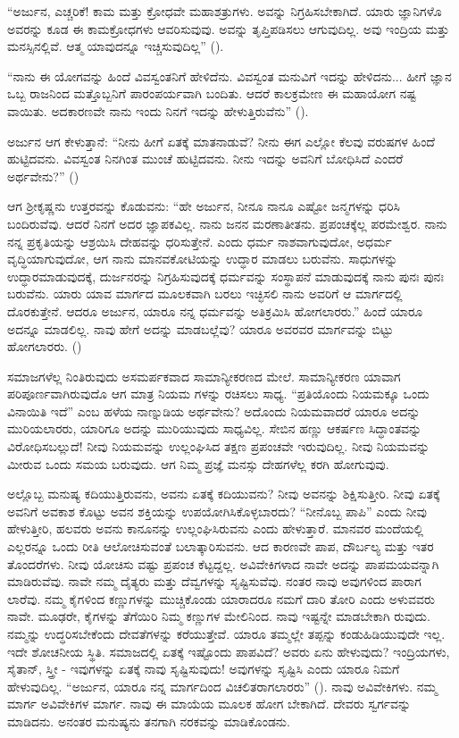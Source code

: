 “ಅರ್ಜುನ, ಎಚ್ಚರಿಕೆ! ಕಾಮ ಮತ್ತು ಕ್ರೋಧವೇ ಮಹಾಶತ್ರುಗಳು. ಅವನ್ನು ನಿಗ್ರಹಿಸಬೇಕಾಗಿದೆ. ಯಾರು ಜ್ಞಾನಿಗಳೊ ಅವರನ್ನು ಕೂಡ ಈ ಕಾಮಕ್ರೋಧಗಳು ಆವರಿಸುವುವು. ಅವನ್ನು ತೃಪ್ತಿಪಡಿಸಲು ಆಗುವುದಿಲ್ಲ. ಅವು ಇಂದ್ರಿಯ ಮತ್ತು ಮನಸ್ಸಿನಲ್ಲಿವೆ. ಆತ್ಮ ಯಾವುದನ್ನೂ ಇಚ್ಚಿಸುವುದಿಲ್ಲ” ().

“ನಾನು ಈ ಯೋಗವನ್ನು ಹಿಂದೆ ವಿವಸ್ವಂತನಿಗೆ ಹೇಳಿದೆನು. ವಿವಸ್ವಂತ ಮನುವಿಗೆ ಇದನ್ನು ಹೇಳಿದನು... ಹೀಗೆ ಜ್ಞಾನ ಒಬ್ಬ ರಾಜನಿಂದ ಮತ್ತೊಬ್ಬನಿಗೆ ಪಾರಂಪರ್ಯವಾಗಿ ಬಂದಿತು. ಆದರೆ ಕಾಲಕ್ರಮೇಣ ಈ ಮಹಾಯೋಗ ನಷ್ಟ ವಾಯಿತು. ಅದಕಾರಣವೇ ನಾನು ಇಂದು ನಿನಗೆ ಇದನ್ನು ಹೇಳುತ್ತಿರುವೆನು” ().

ಅರ್ಜುನ ಆಗ ಕೇಳುತ್ತಾನೆ: “ನೀನು ಹೀಗೆ ಏತಕ್ಕೆ ಮಾತನಾಡುವೆ? ನೀನು ಈಗ ಎಲ್ಲೋ ಕೆಲವು ವರುಷಗಳ ಹಿಂದೆ ಹುಟ್ಟಿದವನು. ವಿವಸ್ವಂತ ನಿನಗಿಂತ ಮುಂಚೆ ಹುಟ್ಟಿದವನು. ನೀನು ಇದನ್ನು ಅವನಿಗೆ ಬೋಧಿಸಿದೆ ಎಂದರೆ ಅರ್ಥವೇನು?” ()

ಆಗ ಶ‍್ರೀಕೃಷ್ಣನು ಉತ್ತರವನ್ನು ಕೊಡುವನು: “ಹೇ ಅರ್ಜುನ, ನೀನೂ ನಾನೂ ಎಷ್ಟೋ ಜನ್ಮಗಳನ್ನು ಧರಿಸಿ ಬಂದಿರುವೆವು. ಆದರೆ ನಿನಗೆ ಅದರ ಜ್ಞಾಪಕವಿಲ್ಲ. ನಾನು ಜನನ ಮರಣಾತೀತನು. ಪ್ರಪಂಚಕ್ಕೆಲ್ಲ ಪರಮೇಶ್ವರ. ನಾನು ನನ್ನ ಪ್ರಕೃತಿಯನ್ನು ಆಶ್ರಯಿಸಿ ದೇಹವನ್ನು ಧರಿಸುತ್ತೇನೆ. ಎಂದು ಧರ್ಮ ನಾಶವಾಗುವುದೋ, ಅಧರ್ಮ ವೃದ್ಧಿಯಾಗುವುದೋ, ಆಗ ನಾನು ಮಾನವಕೋಟಿಯನ್ನು ಉದ್ಧಾರ ಮಾಡಲು ಬರುವೆನು. ಸಾಧುಗಳನ್ನು ಉದ್ಧಾರಮಾಡುವುದಕ್ಕೆ, ದುರ್ಜನರನ್ನು ನಿಗ್ರಹಿಸುವುದಕ್ಕೆ ಧರ್ಮವನ್ನು ಸಂಸ್ಥಾಪನೆ ಮಾಡುವುದಕ್ಕೆ ನಾನು ಪುನಃ ಪುನಃ ಬರುವೆನು. ಯಾರು ಯಾವ ಮಾರ್ಗದ ಮೂಲಕವಾಗಿ ಬರಲು ಇಚ್ಛಿಸಲಿ ನಾನು ಅವರಿಗೆ ಆ ಮಾರ್ಗದಲ್ಲಿ ದೊರಕುತ್ತೇನೆ. ಆದರೂ ಅರ್ಜುನ, ಯಾರೂ ನನ್ನ ಧರ್ಮವನ್ನು ಅತಿಕ್ರಮಿಸಿ ಹೋಗಲಾರರು.” ಹಿಂದೆ ಯಾರೂ ಅದನ್ನೂ ಮಾಡಲಿಲ್ಲ. ನಾವು ಹೇಗೆ ಅದನ್ನು ಮಾಡಬಲ್ಲೆವು? ಯಾರೂ ಅವರವರ ಮಾರ್ಗವನ್ನು ಬಿಟ್ಟು ಹೋಗಲಾರರು. ()

ಸಮಾಜಗಳೆಲ್ಲ ನಿಂತಿರುವುದು ಅಸಮರ್ಪಕವಾದ ಸಾಮಾನ್ಯೀಕರಣದ ಮೇಲೆ. ಸಾಮಾನ್ಯೀಕರಣ ಯಾವಾಗ ಪರಿಪೂರ್ಣವಾಗಿರುವುದೊ ಆಗ ಮಾತ್ರ ನಿಯಮ ಗಳನ್ನು ರಚಿಸಲು ಸಾಧ್ಯ. “ಪ್ರತಿಯೊಂದು ನಿಯಮಕ್ಕೂ ಒಂದು ವಿನಾಯಿತಿ ಇದೆ” ಎಂಬ ಹಳೆಯ ನಾಣ್ನುಡಿಯ ಅರ್ಥವೇನು? ಅದೊಂದು ನಿಯಮವಾದರೆ ಯಾರೂ ಅದನ್ನು ಮುರಿಯಲಾರರು, ಯಾರಿಗೂ ಅದನ್ನು ಮುರಿಯುವುದು ಸಾಧ್ಯವಿಲ್ಲ. ಸೇಬಿನ ಹಣ್ಣು ಆಕರ್ಷಣ ಸಿದ್ಧಾಂತವನ್ನು ವಿರೋಧಿಸಬಲ್ಲುದೆ! ನೀವು ನಿಯಮವನ್ನು ಉಲ್ಲಂಘಿಸಿದ ತಕ್ಷಣ ಪ್ರಪಂಚವೇ ಇರುವುದಿಲ್ಲ. ನೀವು ನಿಯಮವನ್ನು ಮೀರುವ ಒಂದು ಸಮಯ ಬರುವುದು. ಆಗ ನಿಮ್ಮ ಪ್ರಜ್ಞೆ ಮನಸ್ಸು ದೇಹಗಳೆಲ್ಲ ಕರಗಿ ಹೋಗುವುವು.

ಅಲ್ಲೊಬ್ಬ ಮನುಷ್ಯ ಕದಿಯುತ್ತಿರುವನು, ಅವನು ಏತಕ್ಕೆ ಕದಿಯುವನು? ನೀವು ಅವನನ್ನು ಶಿಕ್ಷಿಸುತ್ತೀರಿ. ನೀವು ಏತಕ್ಕೆ ಅವನಿಗೆ ಅವಕಾಶ ಕೊಟ್ಟು ಅವನ ಶಕ್ತಿಯನ್ನು ಉಪಯೋಗಿಸಿಕೊಳ್ಳಬಾರದು? “ನೀನೊಬ್ಬ ಪಾಪಿ” ಎಂದು ನೀವು ಹೇಳುತ್ತೀರಿ, ಹಲವರು ಅವನು ಕಾನೂನನ್ನು ಉಲ್ಲಂಘಿಸಿರುವನು ಎಂದು ಹೇಳುತ್ತಾರೆ. ಮಾನವರ ಮಂದೆಯಲ್ಲಿ ಎಲ್ಲರನ್ನೂ ಒಂದು ರೀತಿ ಆಲೋಚಿಸುವಂತೆ ಬಲಾತ್ಕಾರಿಸುವನು. ಆದ ಕಾರಣವೇ ಪಾಪ, ದೌರ್ಬಲ್ಯ ಮತ್ತು ಇತರ ತೊಂದರೆಗಳು. ನೀವು ಯೋಚಿಸು ವಷ್ಟು ಪ್ರಪಂಚ ಕೆಟ್ಟದ್ದಲ್ಲ. ಅವಿವೇಕಿಗಳಾದ ನಾವೇ ಅದನ್ನು ಪಾಪಮಯವನ್ನಾಗಿ ಮಾಡಿರುವೆವು. ನಾವೇ ನಮ್ಮ ದೈತ್ಯರು ಮತ್ತು ದೆವ್ವಗಳನ್ನು ಸೃಷ್ಟಿಸುವೆವು. ನಂತರ ನಾವು ಅವುಗಳಿಂದ ಪಾರಾಗ ಲಾರೆವು. ನಮ್ಮ ಕೈಗಳಿಂದ ಕಣ್ಣುಗಳನ್ನು ಮುಚ್ಚಿಕೊಂಡು ಯಾರಾದರೂ ನಮಗೆ ದಾರಿ ತೋರಿ ಎಂದು ಅಳುವವರು ನಾವೇ. ಮೂಢರೇ, ಕೈಗಳನ್ನು ತೆಗೆಯಿರಿ ನಿಮ್ಮ ಕಣ್ಣುಗಳ ಮೇಲಿನಿಂದ. ನಾವು ಇಷ್ಟನ್ನೇ ಮಾಡಬೇಕಾಗಿ ರುವುದು. ನಮ್ಮನ್ನು ಉದ್ಧರಿಸಬೇಕೆಂದು ದೇವತೆಗಳನ್ನು ಕರೆಯುತ್ತೇವೆ. ಯಾರೂ ತಮ್ಮಲ್ಲೇ ತಪ್ಪನ್ನು ಕಂಡುಹಿಡಿಯುವುದೇ ಇಲ್ಲ. ಇದೇ ಶೋಚನೀಯ ಸ್ಥಿತಿ. ಸಮಾಜದಲ್ಲಿ ಏತಕ್ಕೆ ಇಷ್ಟೊಂದು ಪಾಪವಿದೆ? ಅವರು ಏನು ಹೇಳುವುದು? ಇಂದ್ರಿಯಗಳು, ಸೈತಾನ್​, ಸ್ತ್ರೀ - ಇವುಗಳನ್ನು ಏತಕ್ಕೆ ನಾವು ಸೃಷ್ಟಿಸುವುದು! ಅವುಗಳನ್ನು ಸೃಷ್ಟಿಸಿ ಎಂದು ಯಾರೂ ನಿಮಗೆ ಹೇಳುವುದಿಲ್ಲ. “ಅರ್ಜುನ, ಯಾರೂ ನನ್ನ ಮಾರ್ಗದಿಂದ ವಿಚಲಿತರಾಗಲಾರರು” (). ನಾವು ಅವಿವೇಕಿಗಳು. ನಮ್ಮ ಮಾರ್ಗ ಅವಿವೇಕಿಗಳ ಮಾರ್ಗ. ನಾವು ಈ ಮಾಯೆಯ ಮೂಲಕ ಹೋಗ ಬೇಕಾಗಿದೆ. ದೇವರು ಸ್ವರ್ಗವನ್ನು ಮಾಡಿದನು. ಅನಂತರ ಮನುಷ್ಯನು ತನಗಾಗಿ ನರಕವನ್ನು ಮಾಡಿಕೊಂಡನು.

